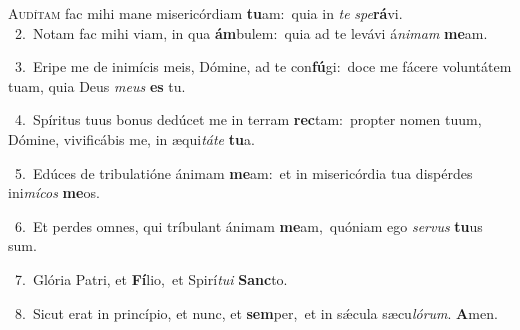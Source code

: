 \lettrine{\initial\textcolor{\initialcolor}{A}}{udítam} fac mihi mane misericórdiam \textbf{tu}\-am:~\star quia in \textit{te} \textit{spe}\-\textbf{rá}vi.\\
{\numbfont\textcolor{\numbcolor}{~2.}}~Notam fac mihi viam, in qua \textbf{ám}\-bulem:~\star quia ad te levávi á\-\textit{ni}\-\textit{mam} \textbf{me}\-am.\par
{\numbfont\textcolor{\numbcolor}{~3.}}~Eripe me de inimícis meis, Dómine, ad te con\-\textbf{fú}\-gi:~\star doce me fácere voluntátem tuam, quia Deus \textit{me}\-\textit{us} \textbf{es} tu.\par
{\numbfont\textcolor{\numbcolor}{~4.}}~Spíritus tuus bonus dedúcet me in terram \textbf{rec}\-tam:~\star propter nomen tuum, Dómine, vivificábis me, in æqui\-\textit{tá}\-\textit{te} \textbf{tu}\-a.\par
{\numbfont\textcolor{\numbcolor}{~5.}}~Edúces de tribulatióne ánimam \textbf{me}\-am:~\star et in misericórdia tua dispérdes ini\-\textit{mí}\-\textit{cos} \textbf{me}\-os.\par
{\numbfont\textcolor{\numbcolor}{~6.}}~Et perdes omnes, qui tríbulant ánimam \textbf{me}\-am,~\star quóniam ego \textit{ser}\-\textit{vus} \textbf{tu}\-us sum.\par
{\numbfont\textcolor{\numbcolor}{~7.}}~Glória Patri, et \textbf{Fí}\-lio,~\star et Spirí\-\textit{tu}\-\textit{i} \textbf{Sanc}\-to.\par
{\numbfont\textcolor{\numbcolor}{~8.}}~Sicut erat in princípio, et nunc, et \textbf{sem}\-per,~\star et in sǽcula sæcu\-\textit{ló}\-\textit{rum}. \textbf{A}\-men.\par
